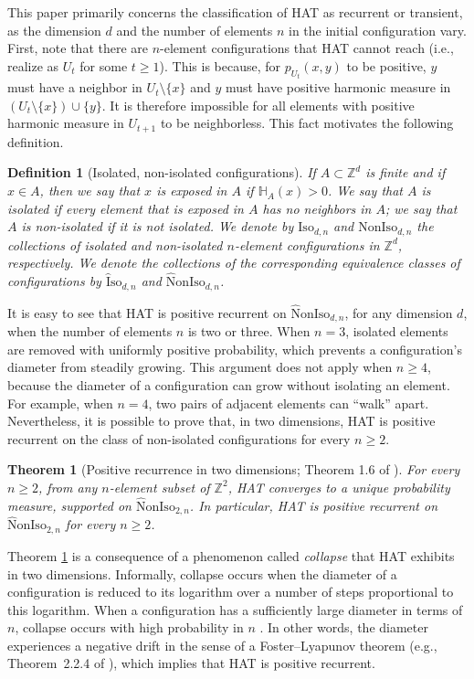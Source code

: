 \documentclass[11pt,reqno]{amsart}
\newtheorem{theorem}{Theorem}
\newtheorem{definition}[lemma]{Definition}
\theoremstyle{definition}
\numberwithin{equation}{section}
\newcommand{\Z}{\mathbb{Z}}
\newcommand{\1}{\mathbf{1}}
\renewcommand{\H}{\mathbb{H}}
\newcommand{\iso}{\mathrm{Iso}}
\newcommand{\noniso}{\mathrm{NonIso}}
\newcommand{\wtiso}{\mathrm{\wt{I}so}}
\newcommand{\wtnoniso}{\mathrm{\wt{N}onIso}}
\newcommand{\wt}{\widehat}
\begin{document}
This paper primarily concerns the classification of HAT as recurrent or transient, as the dimension $d$ and the number of elements $n$ in the initial configuration vary. First, note that there are $n$-element configurations that HAT cannot reach (i.e., realize as $U_t$ for some $t \geq 1$). This is because, for $p_{U_t} (x,y)$ to be positive, $y$ must have a neighbor in $U_t {\setminus} \{x\}$ and $y$ must have positive harmonic measure in $(U_t \setminus \{x\}) \cup \{y\}$. It is therefore impossible for all elements with positive harmonic measure in $U_{t+1}$ to be neighborless. This fact motivates the following definition.

\begin{definition}[Isolated, non-isolated configurations]
If $A \subset \Z^d$ is finite and if $x \in A$, then we say that $x$ is exposed in $A$ if $\H_A (x) > 0$. We say that $A$ is isolated if every element that is exposed in $A$ has no neighbors in $A$; we say that $A$ is non-isolated if it is not isolated. We denote by $\iso_{d,n}$ and $\noniso_{d,n}$ the collections of isolated and non-isolated $n$-element configurations in $\Z^d$, respectively. We denote the collections of the corresponding equivalence classes of configurations by $\wtiso_{d,n}$ and $\wtnoniso_{d,n}$.
\end{definition}

It is easy to see that HAT is positive recurrent on $\wtnoniso_{d,n}$, for any dimension $d$, when the number of elements $n$ is two or three. When $n=3$, isolated elements are removed with uniformly positive probability, which prevents a configuration's diameter from steadily growing. This argument does not apply when $n \geq 4$, because the diameter of a configuration can grow without isolating an element. For example, when $n=4$, two pairs of adjacent elements can ``walk'' apart. Nevertheless, it is possible to prove that, in two dimensions, HAT is positive recurrent on the class of non-isolated configurations for every $n \geq 2$.

\begin{theorem}[Positive recurrence in two dimensions; Theorem 1.6 of \cite{calvert2021}]\label{pos rec}
For every $n \geq 2$, from any $n$-element subset of $\Z^2$, HAT converges to a unique probability measure, supported on $\wtnoniso_{2,n}$. In particular, HAT is positive recurrent on $\wtnoniso_{2,n}$ for every $n \geq 2$.
\end{theorem}

Theorem \ref{pos rec} is a consequence of a phenomenon called {\em collapse} that HAT exhibits in two dimensions. Informally, collapse occurs when the diameter of a configuration is reduced to its logarithm over a number of steps proportional to this logarithm. When a configuration has a sufficiently large diameter in terms of $n$, collapse occurs with high probability in $n$ \cite[Theorem 1.5]{calvert2021}. In other words, the diameter experiences a negative drift in the sense of a Foster--Lyapunov theorem (e.g., Theorem~2.2.4 of \cite{fayolle1995}), which implies that HAT is positive recurrent.
\end{document}
